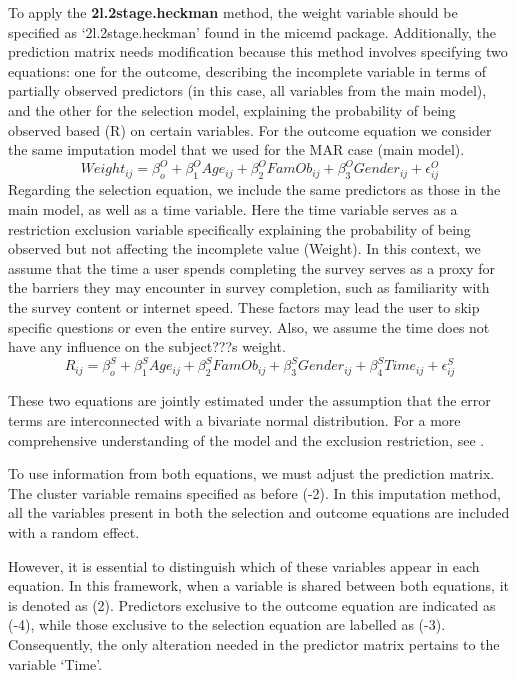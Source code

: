 \documentclass[
]{jss}
\begin{document}
To apply the \textbf{2l.2stage.heckman} method, the weight variable
should be specified as `2l.2stage.heckman' found in the micemd package.
Additionally, the prediction matrix needs modification because this
method involves specifying two equations: one for the outcome,
describing the incomplete variable in terms of partially observed
predictors (in this case, all variables from the main model), and the
other for the selection model, explaining the probability of being
observed based (R) on certain variables. For the outcome equation we
consider the same imputation model that we used for the MAR case (main
model).
\[Weight_{ij}= \beta^O_{o} + \beta^O_{1}Age_{ij} + \beta^O_{2}FamOb_{ij}+ \beta^O_{3}Gender_{ij} + \epsilon^O_{ij}\]
Regarding the selection equation, we include the same predictors as
those in the main model, as well as a time variable. Here the time
variable serves as a restriction exclusion variable specifically
explaining the probability of being observed but not affecting the
incomplete value (Weight). In this context, we assume that the time a
user spends completing the survey serves as a proxy for the barriers
they may encounter in survey completion, such as familiarity with the
survey content or internet speed. These factors may lead the user to
skip specific questions or even the entire survey. Also, we assume the
time does not have any influence on the subject???s weight.
\[R_{ij}= \beta^S_{o} + \beta^S_{1}Age_{ij} + \beta^S_{2}FamOb_{ij}+ \beta^S_{3}Gender_{ij} +\beta^S_{4}Time_{ij}+ \epsilon^S_{ij}\]

These two equations are jointly estimated under the assumption that the
error terms are interconnected with a bivariate normal distribution. For
a more comprehensive understanding of the model and the exclusion
restriction, see \cite{Munoz_2022}.

To use information from both equations, we must adjust the prediction
matrix. The cluster variable remains specified as before (-2). In this
imputation method, all the variables present in both the selection and
outcome equations are included with a random effect.

However, it is essential to distinguish which of these variables appear
in each equation. In this framework, when a variable is shared between
both equations, it is denoted as (2). Predictors exclusive to the
outcome equation are indicated as (-4), while those exclusive to the
selection equation are labelled as (-3). Consequently, the only
alteration needed in the predictor matrix pertains to the variable
`Time'.
\end{document}
